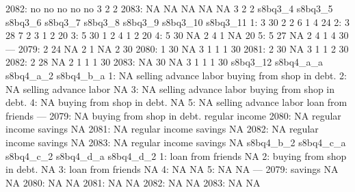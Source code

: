 \begin{Schunk}
\begin{Soutput}
2082:      no      no       no       no       no       3       2       2
2083:      NA      NA       NA       NA       NA       3       2       2
      s8bq3_4 s8bq3_5 s8bq3_6 s8bq3_7 s8bq3_8 s8bq3_9 s8bq3_10 s8bq3_11
   1:       3      30       2       2       6       1        4       24
   2:       3      28       7       2       3       1        2       20
   3:       5      30       1       2       4       1        2       20
   4:       5      30      NA       2       4       1       NA       20
   5:       5      27      NA       2       4       1        4       30
  ---                                                                  
2079:       2      24      NA       2       1      NA        2       30
2080:       1      30      NA       3       1       1        1       30
2081:       2      30      NA       3       1       1        2       30
2082:       2      28      NA       2       1       1        1       30
2083:      NA      30      NA       3       1       1        1       30
      s8bq3_12                 s8bq4_a_a s8bq4_a_2                 s8bq4_b_a
   1:       NA     selling advance labor           buying from shop in debt.
   2:       NA     selling advance labor                                  NA
   3:       NA     selling advance labor           buying from shop in debt.
   4:       NA buying from shop in debt.                                  NA
   5:       NA     selling advance labor                   loan from friends
  ---                                                                       
2079:       NA buying from shop in debt.                      regular income
2080:       NA            regular income   savings                        NA
2081:       NA            regular income   savings                        NA
2082:       NA            regular income   savings                        NA
2083:       NA            regular income   savings                        NA
      s8bq4_b_2                 s8bq4_c_a s8bq4_c_2 s8bq4_d_a s8bq4_d_2
   1:                   loan from friends                  NA          
   2:           buying from shop in debt.                  NA          
   3:                   loan from friends                  NA          
   4:                                  NA                  NA          
   5:                                  NA                  NA          
  ---                                                                  
2079:   savings                        NA                  NA          
2080:                                  NA                  NA          
2081:                                  NA                  NA          
2082:                                  NA                  NA          
2083:                                  NA                  NA          


\end{Soutput}
\end{Schunk}
